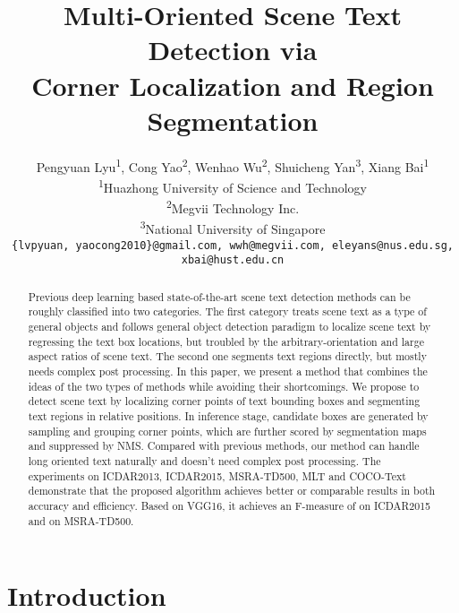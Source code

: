 \documentclass[10pt,twocolumn,letterpaper]{article}
\begin{document}
\title{Multi-Oriented Scene Text Detection via \\ Corner Localization and Region Segmentation}

\author{Pengyuan Lyu\textsuperscript{1}, Cong Yao\textsuperscript{2}, Wenhao Wu\textsuperscript{2}, Shuicheng Yan\textsuperscript{3}, Xiang Bai\textsuperscript{1}\\
\textsuperscript{1}Huazhong University of Science and Technology\\
\textsuperscript{2}Megvii Technology Inc.\\
\textsuperscript{3}National University of Singapore\\
{\tt\small \{lvpyuan, yaocong2010\}@gmail.com, wwh@megvii.com, eleyans@nus.edu.sg, xbai@hust.edu.cn}}

\maketitle


\begin{abstract}
Previous deep learning based state-of-the-art scene text detection methods can be roughly classified into two categories. The first category treats scene text as a type of general objects and follows general object detection paradigm to localize scene text by regressing the text box locations, but troubled by the arbitrary-orientation and large aspect ratios of scene text. The second one segments text regions directly, but mostly needs complex post processing. In this paper, we present a method that combines the ideas of the two types of methods while avoiding their shortcomings. We propose to detect scene text by localizing corner points of text bounding boxes and segmenting text regions in relative positions. In inference stage, candidate boxes are generated by sampling and grouping corner points, which are further scored by segmentation maps and suppressed by NMS. Compared with previous methods, our method can handle long oriented text naturally and doesn't need complex post processing. The experiments on ICDAR2013, ICDAR2015, MSRA-TD500, MLT and COCO-Text demonstrate that the proposed algorithm achieves better or comparable results in both accuracy and efficiency. Based on VGG16, it achieves an F-measure of \textbf{} on ICDAR2015 and \textbf{} on MSRA-TD500.
\end{abstract}

\section{Introduction}
\end{document}
